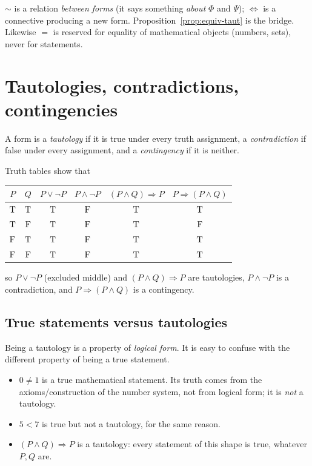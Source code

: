 \begin{warning}
	$\sim$ is a relation \emph{between forms} (it says something \emph{about} $\Phi$ and $\Psi$); $\Leftrightarrow$ is a connective producing a new form. Proposition~\ref{prop:equiv-taut} is the bridge. Likewise $=$ is reserved for equality of mathematical objects (numbers, sets), never for statements.
\end{warning}

\section{Tautologies, contradictions, contingencies}

\begin{definition}\label{def:taut}
	A form is a \emph{tautology} if it is true under every truth assignment, a \emph{contradiction} if false under every assignment, and a \emph{contingency} if it is neither.
\end{definition}

\begin{example}\label{ex:taut-list}
	Truth tables show that
	\begin{center}
		\begin{tabular}{cc|c|c|c|c}
			$P$&$Q$&$P\vee\neg P$&$P\wedge\neg P$&$(P\wedge Q)\Rightarrow P$&$P\Rightarrow(P\wedge Q)$\\ \midrule
			$\mathrm{T}$&$\mathrm{T}$&$\mathrm{T}$&$\mathrm{F}$&$\mathrm{T}$&$\mathrm{T}$\\
			$\mathrm{T}$&$\mathrm{F}$&$\mathrm{T}$&$\mathrm{F}$&$\mathrm{T}$&$\mathrm{F}$\\
			$\mathrm{F}$&$\mathrm{T}$&$\mathrm{T}$&$\mathrm{F}$&$\mathrm{T}$&$\mathrm{T}$\\
			$\mathrm{F}$&$\mathrm{F}$&$\mathrm{T}$&$\mathrm{F}$&$\mathrm{T}$&$\mathrm{T}$
		\end{tabular}
	\end{center}
	so $P\vee\neg P$ (excluded middle) and $(P\wedge Q)\Rightarrow P$ are tautologies, $P\wedge\neg P$ is a contradiction, and $P\Rightarrow(P\wedge Q)$ is a contingency.
\end{example}

\subsection*{True statements versus tautologies}

Being a tautology is a property of \emph{logical form}. It is easy to confuse with the different property of being a true statement.

\begin{itemize}
	\item $0\neq 1$ is a true mathematical statement. Its truth comes from the axioms/construction of the number system, not from logical form; it is \emph{not} a tautology.
	\item $5<7$ is true but not a tautology, for the same reason.
	\item $(P\wedge Q)\Rightarrow P$ is a tautology: every statement of this shape is true, whatever $P,Q$ are.
\end{itemize}

